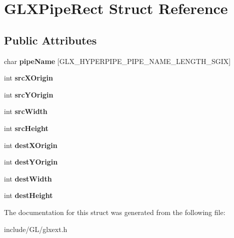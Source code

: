 \hypertarget{structGLXPipeRect}{\section{\-G\-L\-X\-Pipe\-Rect \-Struct \-Reference}
\label{structGLXPipeRect}
}
\subsection*{\-Public \-Attributes}
\begin{DoxyCompactItemize}
\item 
\hypertarget{structGLXPipeRect_aa4c4f60e9647705ddefa10f95a37cb79}{char {\bfseries pipe\-Name} \mbox{[}\-G\-L\-X\-\_\-\-H\-Y\-P\-E\-R\-P\-I\-P\-E\-\_\-\-P\-I\-P\-E\-\_\-\-N\-A\-M\-E\-\_\-\-L\-E\-N\-G\-T\-H\-\_\-\-S\-G\-I\-X\mbox{]}}\label{structGLXPipeRect_aa4c4f60e9647705ddefa10f95a37cb79}

\item 
\hypertarget{structGLXPipeRect_a9df2313c01f75d149e64f2ff467bc266}{int {\bfseries src\-X\-Origin}}\label{structGLXPipeRect_a9df2313c01f75d149e64f2ff467bc266}

\item 
\hypertarget{structGLXPipeRect_a1f7316dff7050ab2ce9d3d37f8c5450e}{int {\bfseries src\-Y\-Origin}}\label{structGLXPipeRect_a1f7316dff7050ab2ce9d3d37f8c5450e}

\item 
\hypertarget{structGLXPipeRect_a2c6c180a4dabb71076366e06a1c7d0ef}{int {\bfseries src\-Width}}\label{structGLXPipeRect_a2c6c180a4dabb71076366e06a1c7d0ef}

\item 
\hypertarget{structGLXPipeRect_a35632524bce6bffa05f284a9b1c1b8ff}{int {\bfseries src\-Height}}\label{structGLXPipeRect_a35632524bce6bffa05f284a9b1c1b8ff}

\item 
\hypertarget{structGLXPipeRect_a8b7b941894ad3420326d7e9fa885bb71}{int {\bfseries dest\-X\-Origin}}\label{structGLXPipeRect_a8b7b941894ad3420326d7e9fa885bb71}

\item 
\hypertarget{structGLXPipeRect_aef7766b02ef07c20a11e89da5878b469}{int {\bfseries dest\-Y\-Origin}}\label{structGLXPipeRect_aef7766b02ef07c20a11e89da5878b469}

\item 
\hypertarget{structGLXPipeRect_a3c07991d2a8fb6e973eae834650b3dad}{int {\bfseries dest\-Width}}\label{structGLXPipeRect_a3c07991d2a8fb6e973eae834650b3dad}

\item 
\hypertarget{structGLXPipeRect_a858b0ea6642e451495aff35cfefbd083}{int {\bfseries dest\-Height}}\label{structGLXPipeRect_a858b0ea6642e451495aff35cfefbd083}

\end{DoxyCompactItemize}


\-The documentation for this struct was generated from the following file\-:\begin{DoxyCompactItemize}
\item 
include/\-G\-L/glxext.\-h\end{DoxyCompactItemize}
